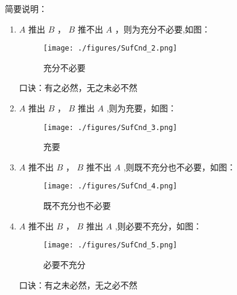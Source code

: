 简要说明：
\begin{enumerate}
有命题 $A$ 和 $B$ 
\item $A$ 推出 $B$ ， $B$ 推不出 $A$ ，则为充分不必要,如图：\begin{figure}[ht]
\centering
\texttt{[image: ./figures/SufCnd\_2.png]}
\caption{充分不必要} \label{SufCnd_fig2}
\end{figure}
口诀：有之必然，无之未必不然
\item $A$ 推出 $B$ ， $B$ 推出 $A$ ,则为充要，如图：\begin{figure}[ht]
\centering
\texttt{[image: ./figures/SufCnd\_3.png]}
\caption{充要} \label{SufCnd_fig3}
\end{figure}
\item $A$ 推不出 $B$ ， $B$ 推不出 $A$ ,则既不充分也不必要，如图：\begin{figure}[ht]
\centering
\texttt{[image: ./figures/SufCnd\_4.png]}
\caption{既不充分也不必要} \label{SufCnd_fig4}
\end{figure}
\item $A$ 推不出 $B$ ， $B$ 推出 $A$ ,则必要不充分，如图：\begin{figure}[ht]
\centering
\texttt{[image: ./figures/SufCnd\_5.png]}
\caption{必要不充分} \label{SufCnd_fig5}
\end{figure}
口诀：有之未必然，无之必不然
\end {enumerate}
